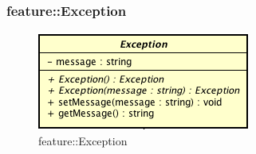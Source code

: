 \subsubsection{feature::Exception}

\label{feature::Exception}
\begin{figure}[ht]
	\centering
	\includegraphics[scale=0.5]{Sezioni/SottosezioniST/img/app/Exception.png}
	\caption{feature::Exception}
\end{figure}


